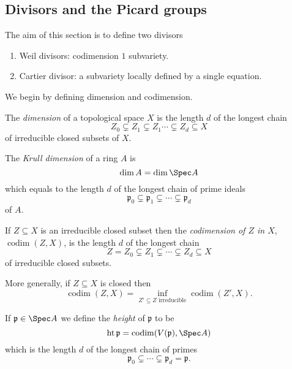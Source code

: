 \documentclass[a4paper]{article}
\DeclareMathOperator{\codim}{codim} %
\begin{document}
\subsection{Divisors and the Picard groups}

The aim of this section is to define two divisors
\begin{enumerate}
\item Weil divisors: codimension \(1\) subvariety.
\item Cartier divisor: a subvariety locally defined by a single equation.
\end{enumerate}

We begin by defining dimension and codimension.

\begin{definition}
  The \emph{dimension} of a topological space \(X\) is the length \(d\) of the longest chain
  \[
    Z_0 \subsetneq Z_1 \subsetneq Z_1 \cdots \subsetneq Z_d \subseteq X
  \]
  of irreducible closed subsets of \(X\).
\end{definition}

\begin{definition}
  The \emph{Krull dimension} of a ring \(A\) is
  \[
    \dim A = \dim \Spec A
  \]
  which equals to the length \(d\) of the longest chain of prime ideals
  \[
    \mathfrak p_0 \subsetneq \mathfrak p_1 \subsetneq \cdots \subsetneq \mathfrak p_d
  \]
  of \(A\).
\end{definition}

\begin{definition}[codimension]
  If \(Z \subseteq X\) is an irreducible closed subset then the \emph{codimension of \(Z\) in \(X\)}, \(\codim(Z, X)\), is the length \(d\) of the longest chain
  \[
    Z = Z_0 \subsetneq Z_1 \subsetneq \cdots \subsetneq Z_d \subseteq X
  \]
  of irreducible closed subsets.

  More generally, if \(Z \subseteq X\) is closed then
  \[
    \codim(Z, X) = \inf_{Z' \subseteq Z \text{ irreducible}} \codim(Z', X).
  \]
\end{definition}

\begin{definition}[height]
  If \(\mathfrak p \in \Spec A\) we define the \emph{height} of \(\mathfrak p\) to be
  \[
    \operatorname{ht} \mathfrak p = \codim(V(\mathfrak p), \Spec A)
  \]
  which is the length \(d\) of the longest chain of primes
  \[
    \mathfrak p_0 \subsetneq \cdots \subsetneq \mathfrak p_d = \mathfrak p.
  \]
\end{definition}
\end{document}
